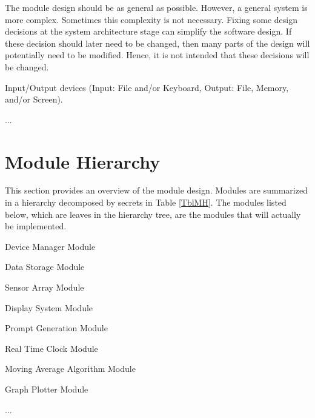 \documentclass[12pt, titlepage]{article}
\newcounter{ucnum}
\newcommand{\uctheucnum}{UC\theucnum}
\newcounter{mnum}
\newcommand{\mthemnum}{M\themnum}
\begin{document}
The module design should be as general as possible. However, a general system is
more complex. Sometimes this complexity is not necessary. Fixing some design
decisions at the system architecture stage can simplify the software design. If
these decision should later need to be changed, then many parts of the design
will potentially need to be modified. Hence, it is not intended that these
decisions will be changed.

\begin{description}
  \item[ \uctheucnum \label{ucIO}:] Input/Output devices
    (Input: File and/or Keyboard, Output: File, Memory, and/or Screen).
  \item ...
\end{description}

\section{Module Hierarchy} \label{SecMH}

This section provides an overview of the module design. Modules are summarized
in a hierarchy decomposed by secrets in Table \ref{TblMH}. The modules listed
below, which are leaves in the hierarchy tree, are the modules that will
actually be implemented.

\begin{description}
  \item [ \mthemnum \label{mDM}:] Device Manager Module
  \item [ \mthemnum \label{mDS_1}:] Data Storage Module
  \item [ \mthemnum \label{mSA}:] Sensor Array Module
  \item [ \mthemnum \label{mDS_2}:] Display System Module
  \item [ \mthemnum \label{mPG}:] Prompt Generation Module
  \item [ \mthemnum \label{mRTC}:] Real Time Clock  Module
  \item [ \mthemnum \label{mMAA}:] Moving Average Algorithm Module
  \item [ \mthemnum \label{mGP}:] Graph Plotter  Module
  \item ...
\end{description}
\end{document}
